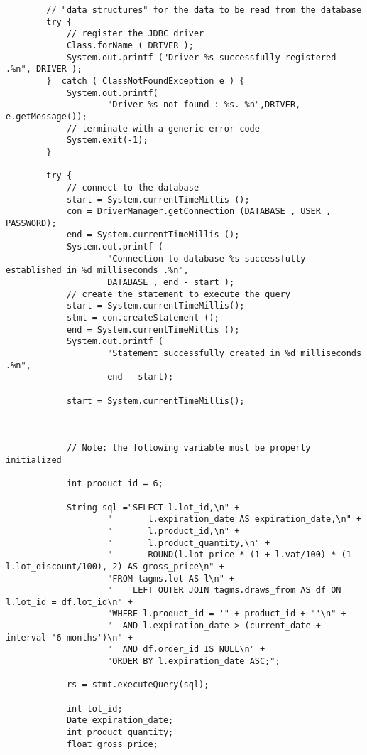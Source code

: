 \begin{lstlisting}
        // "data structures" for the data to be read from the database
        try {
            // register the JDBC driver
            Class.forName ( DRIVER );
            System.out.printf ("Driver %s successfully registered .%n", DRIVER );
        }  catch ( ClassNotFoundException e ) {
            System.out.printf(
                    "Driver %s not found : %s. %n",DRIVER, e.getMessage());
            // terminate with a generic error code
            System.exit(-1);
        }

        try {
            // connect to the database
            start = System.currentTimeMillis ();
            con = DriverManager.getConnection (DATABASE , USER , PASSWORD);
            end = System.currentTimeMillis ();
            System.out.printf (
                    "Connection to database %s successfully established in %d milliseconds .%n",
                    DATABASE , end - start );
            // create the statement to execute the query
            start = System.currentTimeMillis();
            stmt = con.createStatement ();
            end = System.currentTimeMillis ();
            System.out.printf (
                    "Statement successfully created in %d milliseconds .%n",
                    end - start);

            start = System.currentTimeMillis();



            // Note: the following variable must be properly initialized

            int product_id = 6;

            String sql ="SELECT l.lot_id,\n" +
                    "       l.expiration_date AS expiration_date,\n" +
                    "       l.product_id,\n" +
                    "       l.product_quantity,\n" +
                    "       ROUND(l.lot_price * (1 + l.vat/100) * (1 - l.lot_discount/100), 2) AS gross_price\n" +
                    "FROM tagms.lot AS l\n" +
                    "    LEFT OUTER JOIN tagms.draws_from AS df ON l.lot_id = df.lot_id\n" +
                    "WHERE l.product_id = '" + product_id + "'\n" +
                    "  AND l.expiration_date > (current_date + interval '6 months')\n" +
                    "  AND df.order_id IS NULL\n" +
                    "ORDER BY l.expiration_date ASC;";

            rs = stmt.executeQuery(sql);

            int lot_id;
            Date expiration_date;
            int product_quantity;
            float gross_price;


\end{lstlisting}
